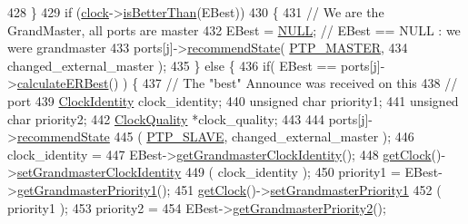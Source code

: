 \begin{DoxyCode}
428         \}
429         \textcolor{keywordflow}{if} (\hyperlink{class_common_port_aa2bc8731fa5aeb5b033feebc2b67258c}{clock}->\hyperlink{class_i_e_e_e1588_clock_a3bf4e41c1ccf46f20b2330330bd69630}{isBetterThan}(EBest))
430         \{
431             \textcolor{comment}{// We are the GrandMaster, all ports are master}
432             EBest = \hyperlink{openavb__types__base__pub_8h_a070d2ce7b6bb7e5c05602aa8c308d0c4}{NULL};   \textcolor{comment}{// EBest == NULL : we were grandmaster}
433             ports[j]->\hyperlink{class_common_port_aa7588da5b66a33afeeda586e6abd334a}{recommendState}( \hyperlink{ptptypes_8hpp_a679431f1afc75d7bb9e972c022e53672ab4c763cac238b6403615a62111b64aa4}{PTP\_MASTER},
434                           changed\_external\_master );
435         \} \textcolor{keywordflow}{else} \{
436             \textcolor{keywordflow}{if}( EBest == ports[j]->\hyperlink{class_common_port_a6951410ed8e6a5ef44a028ef0a50cdeb}{calculateERBest}() ) \{
437                 \textcolor{comment}{// The "best" Announce was received on this}
438                 \textcolor{comment}{// port}
439                 \hyperlink{class_clock_identity}{ClockIdentity} clock\_identity;
440                 \textcolor{keywordtype}{unsigned} \textcolor{keywordtype}{char} priority1;
441                 \textcolor{keywordtype}{unsigned} \textcolor{keywordtype}{char} priority2;
442                 \hyperlink{struct_clock_quality}{ClockQuality} *clock\_quality;
443 
444                 ports[j]->\hyperlink{class_common_port_aa7588da5b66a33afeeda586e6abd334a}{recommendState}
445                     ( \hyperlink{ptptypes_8hpp_a679431f1afc75d7bb9e972c022e53672a55a1a2eb4b93c65e3bba86278510cb04}{PTP\_SLAVE}, changed\_external\_master );
446                 clock\_identity =
447                     EBest->\hyperlink{class_p_t_p_message_announce_aa9865dc21693b99907be1a5aa70aa8ae}{getGrandmasterClockIdentity}();
448                 \hyperlink{class_common_port_ab8e59ecfb51ec14e166bc8bfc872b1ef}{getClock}()->\hyperlink{class_i_e_e_e1588_clock_ab6eabbbfe58761a3db3b40721a0bd808}{setGrandmasterClockIdentity}
449                     ( clock\_identity );
450                 priority1 = EBest->\hyperlink{class_p_t_p_message_announce_a78151d3c07bb5d72555b8aec6d765f88}{getGrandmasterPriority1}();
451                 \hyperlink{class_common_port_ab8e59ecfb51ec14e166bc8bfc872b1ef}{getClock}()->\hyperlink{class_i_e_e_e1588_clock_a6d12713c65a9d60198a3d3bc27a77929}{setGrandmasterPriority1}
452                     ( priority1 );
453                 priority2 =
454                     EBest->\hyperlink{class_p_t_p_message_announce_a7bd53c122e2026948da666611d2529b9}{getGrandmasterPriority2}();

\end{DoxyCode}
